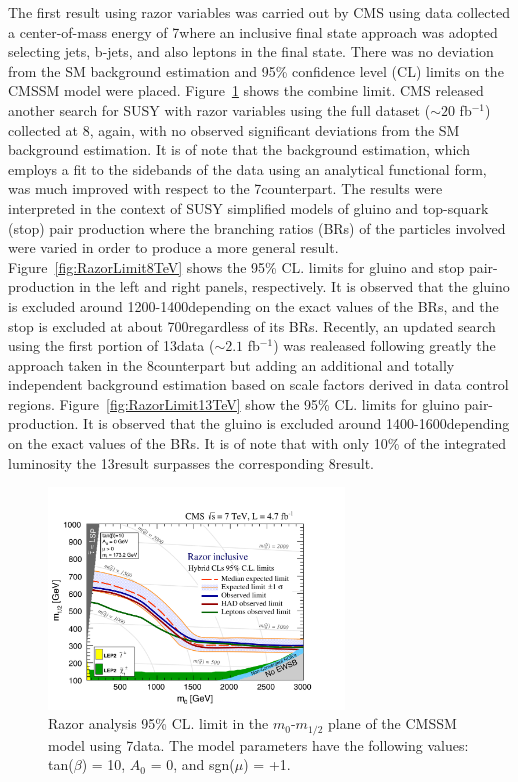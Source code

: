 The first result using razor variables was carried out by CMS using data
collected a center-of-mass energy of 7\TeV where an inclusive final
state approach was adopted selecting jets, b-jets, and also leptons in
the final state. There was no deviation from the SM background
estimation and 95\% confidence level (CL) limits on the CMSSM model
were placed. Figure~\ref{fig:Limit7TeV} shows the combine limit.
CMS released another search for SUSY with razor variables using the full
dataset ($\sim 20$ fb$^{-1}$) collected at 8\TeV, again, with no observed significant
deviations from the SM background estimation. It is of note that the
background estimation, which employs a fit to the sidebands of the
data using an analytical functional form, was much improved with
respect to the 7\TeV counterpart. The results were interpreted in the
context of SUSY simplified models of gluino and top-squark (stop) pair
production where the branching ratios (BRs) of the particles involved
were varied in order to produce a more general
result. Figure~\ref{fig:RazorLimit8TeV} shows the 95\% CL. limits for
gluino and stop pair-production in the left and right panels,
respectively. It is observed that the gluino is excluded around
1200-1400\GeV depending on the exact values of the BRs, and the stop is
excluded at about 700\GeV regardless of its BRs. Recently, an updated
search using the first portion of 13\TeV data ($\sim 2.1$ fb$^{-1}$) was realeased following
greatly the approach taken in the 8\TeV counterpart but adding an
additional and totally independent background estimation based on scale
factors derived in data control
regions. Figure~\ref{fig:RazorLimit13TeV} show the 95\% CL. limits for
gluino pair-production. It is observed that the gluino is excluded around
1400-1600\GeV depending on the exact values of the BRs. It is of note
that with only 10\% of the integrated luminosity the 13\TeV result
surpasses the corresponding 8\TeV result.
 
\begin{figure}
 \centering
\includegraphics[width=0.7\textwidth]{RazorVariables/Limit7TeV.pdf}
\caption{Razor analysis 95\% CL. limit in the $m_{0}$-$m_{1/2}$
  plane of the CMSSM model using 7\TeV data. The model parameters have the following values: tan($\beta$) =
  10, $A_{0}$ = 0, and sgn($\mu$) = +1.\label{fig:Limit7TeV}}
\end{figure} 

